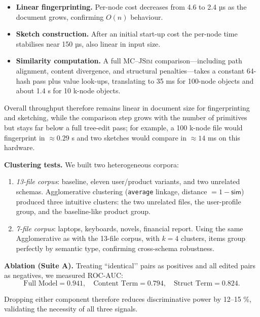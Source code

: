 \documentclass[sigconf]{acmart}
\begin{document}
\begin{itemize}
\item \textbf{Linear fingerprinting.}  Per-node cost decreases from
      4.6 to 2.4 µs as the document grows, confirming \(O(n)\) behaviour.
\item \textbf{Sketch construction.}  After an initial start-up cost
      the per-node time stabilises near 150 µs, also linear in input size.
\item \textbf{Similarity computation.}  A full \textsc{MC--JSim}
      comparison—including path alignment, content divergence, and
      structural penalties—takes a constant 64-hash pass plus value
      look-ups, translating to 35 ms for 100-node objects and about
      1.4 s for 10 k-node objects.
\end{itemize}

Overall throughput therefore remains linear in document size for
fingerprinting and sketching, while the comparison step grows with the
number of primitives but stays far below a full tree-edit pass; for
example, a 100 k-node file would fingerprint in \(\approx0.29\) s and two
sketches would compare in \(\approx14\) ms on this hardware.

\bigskip
\noindent\textbf{Clustering tests.}
We built two heterogeneous corpora:

\begin{enumerate}
\item \emph{13-file corpus}: baseline, eleven user/product variants, and
      two unrelated schemas.  Agglomerative clustering
      (\texttt{average} linkage, distance \(=1-\mathsf{sim}\))
      produced three intuitive clusters:  
      the two unrelated files, the user-profile group, and the
      baseline-like product group.
\item \emph{7-file corpus}: laptops, keyboards, novels, financial report.
      Using the same Agglomerative as with the 13-file corpus, with \(k=4\) clusters, items group perfectly by semantic type,
      confirming cross-schema robustness.
\end{enumerate}

\bigskip
\noindent\textbf{Ablation (Suite A).}
Treating “identical’’ pairs as positives and all edited pairs as
negatives, we measured ROC-AUC:
\[
\text{Full Model}=0.941,\quad
\text{Content Term}=0.794,\quad
\text{Struct Term}=0.824.
\]

Dropping either component therefore reduces discriminative power by
12–15 \%, validating the necessity of all three signals.
\end{document}
